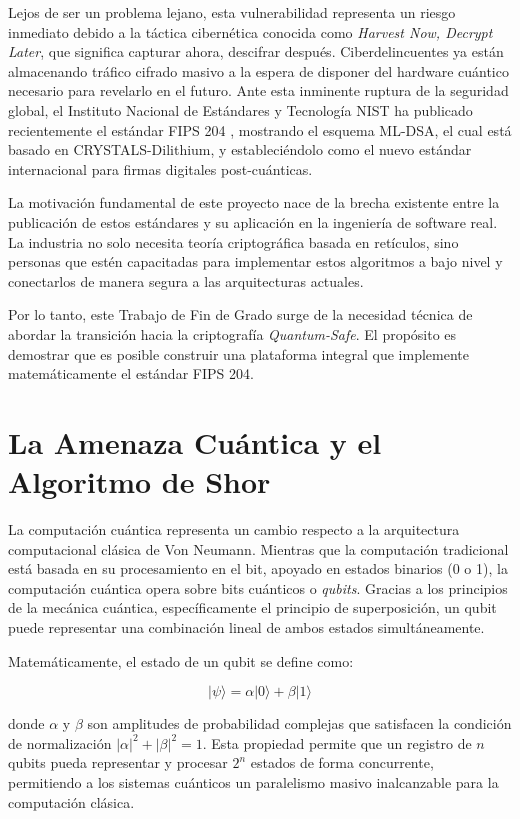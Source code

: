 \documentclass[11pt, a4paper]{report}
\theoremstyle{definition}
\begin{document}
Lejos de ser un problema lejano, esta vulnerabilidad representa un riesgo inmediato debido a la táctica cibernética conocida como \textit{Harvest Now, Decrypt Later}, que significa capturar ahora, descifrar después. Ciberdelincuentes ya están almacenando tráfico cifrado masivo a la espera de disponer del hardware cuántico necesario para revelarlo en el futuro. Ante esta inminente ruptura de la seguridad global, el Instituto Nacional de Estándares y Tecnología NIST ha publicado recientemente el estándar FIPS 204 \cite{nist_fips204}, mostrando el esquema ML-DSA, el cual está basado en CRYSTALS-Dilithium, y estableciéndolo como el nuevo estándar internacional para firmas digitales post-cuánticas.

La motivación fundamental de este proyecto nace de la brecha existente entre la publicación de estos estándares y su aplicación en la ingeniería de software real. La industria no solo necesita teoría criptográfica basada en retículos, sino personas que estén capacitadas para implementar estos algoritmos a bajo nivel y conectarlos de manera segura a las arquitecturas actuales. 

Por lo tanto, este Trabajo de Fin de Grado surge de la necesidad técnica de abordar la transición hacia la criptografía \textit{Quantum-Safe}. El propósito es demostrar que es posible construir una plataforma integral que implemente matemáticamente el estándar FIPS 204.

\section{La Amenaza Cuántica y el Algoritmo de Shor}

La computación cuántica representa un cambio respecto a la arquitectura computacional clásica de Von Neumann. Mientras que la computación tradicional está basada en su procesamiento en el bit, apoyado en estados binarios (0 o 1), la computación cuántica opera sobre bits cuánticos o \textit{qubits}. Gracias a los principios de la mecánica cuántica, específicamente el principio de superposición, un qubit puede representar una combinación lineal de ambos estados simultáneamente.

Matemáticamente, el estado de un qubit se define como:

$$|\psi\rangle = \alpha|0\rangle + \beta|1\rangle$$

donde $\alpha$ y $\beta$ son amplitudes de probabilidad complejas que satisfacen la condición de normalización $|\alpha|^2 + |\beta|^2 = 1$. Esta propiedad permite que un registro de $n$ qubits pueda representar y procesar $2^n$ estados de forma concurrente, permitiendo a los sistemas cuánticos un paralelismo masivo inalcanzable para la computación clásica.
\end{document}
